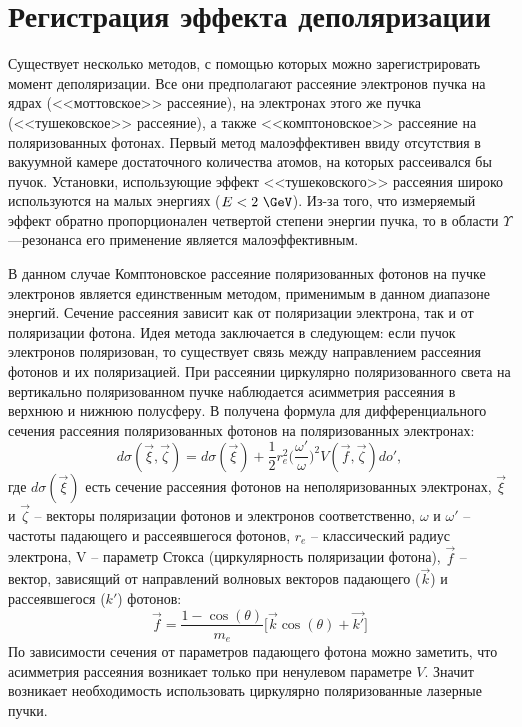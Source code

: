 \section{Регистрация эффекта деполяризации}
Существует несколько методов, с помощью которых можно зарегистрировать момент деполяризации. Все они предполагают рассеяние электронов пучка на ядрах (<<моттовское>> рассеяние), на электронах этого же пучка (<<тушековское>> рассеяние), а также <<комптоновское>> рассеяние на поляризованных фотонах. Первый метод малоэффективен ввиду отсутствия в вакуумной камере достаточного количества атомов, на которых рассеивался бы пучок. Установки, использующие эффект <<тушековского>> рассеяния широко используются на малых энергиях ($E < 2~\GeV$). Из-за того, что измеряемый эффект обратно пропорционален четвертой степени энергии пучка, то в области $\Upsilon$---резонанса его применение является малоэффективным.
\par В данном случае Комптоновское рассеяние поляризованных фотонов на пучке электронов является единственным методом, применимым в данном диапазоне энергий. Сечение рассеяния зависит как от поляризации электрона, так и от поляризации фотона. Идея метода заключается в следующем: если пучок электронов поляризован, то существует связь между направлением рассеяния фотонов и их поляризацией. При рассеянии циркулярно поляризованного света на вертикально поляризованном пучке наблюдается асимметрия рассеяния в верхнюю и нижнюю полусферу. В \cite{landau_4} получена формула для дифференциального сечения рассеяния поляризованных фотонов на поляризованных электронах:
\begin{equation}
d \sigma(\vec{\xi}, \vec{\zeta}) = d\sigma(\vec{\xi}) + \frac{1}{2}r_e^2 \biggl(\frac{\omega'}{\omega}\biggr)^2 V (\vec{f},\vec{\zeta})do',
\label{eq:diff_cross_sec}
\end{equation}
где $d\sigma(\vec{\xi})$ есть сечение рассеяния фотонов на неполяризованных электронах, $\vec{\xi}$ и $\vec{\zeta}$ -- векторы поляризации фотонов и электронов соответственно, $\omega$ и $\omega'$ -- частоты падающего и рассеявшегося фотонов, $r_e$ -- классический радиус электрона, V -- параметр Стокса (циркулярность поляризации фотона), $\vec{f}$ -- вектор, зависящий от направлений волновых векторов падающего ($\vec{k}$) и рассеявшегося (${k'}$) фотонов: 
\begin{equation}
	\vec{f} = \frac{1 - \cos(\theta)}{m_e}\bigg[\vec{k} \cos(\theta) + \vec{k'}\bigg]
\end{equation}
 По зависимости сечения от параметров падающего фотона можно заметить, что асимметрия рассеяния возникает только при ненулевом параметре $V$. Значит возникает необходимость использовать циркулярно поляризованные лазерные пучки. 
